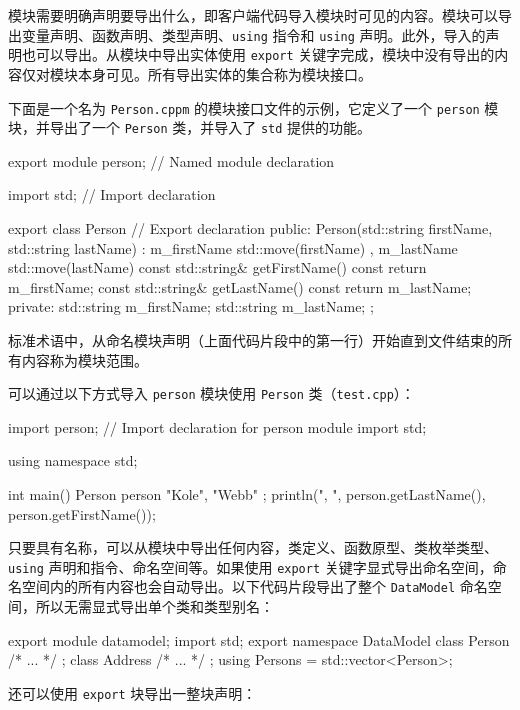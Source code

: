 模块需要明确声明要导出什么，即客户端代码导入模块时可见的内容。模块可以导出变量声明、函数声明、类型声明、\verb|using| 指令和 \verb|using| 声明。此外，导入的声明也可以导出。从模块中导出实体使用 \verb|export| 关键字完成，模块中没有导出的内容仅对模块本身可见。所有导出实体的集合称为模块接口。

下面是一个名为 \verb|Person.cppm| 的模块接口文件的示例，它定义了一个 \verb|person| 模块，并导出了一个 \verb|Person| 类，并导入了 \verb|std| 提供的功能。

\begin{cpp}
export module person; // Named module declaration

import std; // Import declaration

export class Person // Export declaration
{
    public:
        Person(std::string firstName, std::string lastName)
            : m_firstName { std::move(firstName) }
            , m_lastName { std::move(lastName) } { }
        const std::string& getFirstName() const { return m_firstName; }
        const std::string& getLastName() const { return m_lastName; }
    private:
        std::string m_firstName;
        std::string m_lastName;
};
\end{cpp}

标准术语中，从命名模块声明（上面代码片段中的第一行）开始直到文件结束的所有内容称为模块范围。

可以通过以下方式导入 \verb|person| 模块使用 \verb|Person| 类（\verb|test.cpp|）：

\begin{cpp}
import person; // Import declaration for person module
import std;

using namespace std;

int main()
{
    Person person { "Kole", "Webb" };
    println("{}, {}", person.getLastName(), person.getFirstName());
}
\end{cpp}

只要具有名称，可以从模块中导出任何内容，类定义、函数原型、类枚举类型、\verb|using| 声明和指令、命名空间等。如果使用 \verb|export| 关键字显式导出命名空间，命名空间内的所有内容也会自动导出。以下代码片段导出了整个 \verb|DataModel| 命名空间，所以无需显式导出单个类和类型别名：

\begin{cpp}
export module datamodel;
import std;
export namespace DataModel
{
    class Person { /* ... */ };
    class Address { /* ... */ };
    using Persons = std::vector<Person>;
}
\end{cpp}

还可以使用 \verb|export| 块导出一整块声明：

